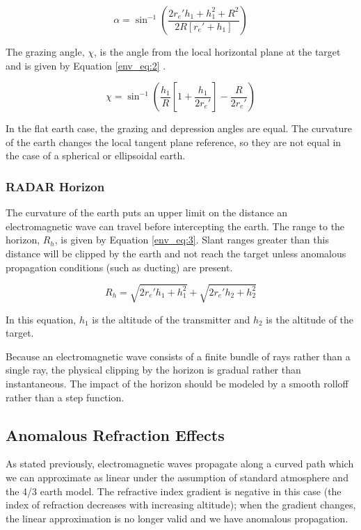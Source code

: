 \begin{equation}
  \label{env_eq:1}
  \alpha = \sin^{-1}\left(\frac{2r_e'h_1 + h_1^2 + R^2}{2R\left[r_e' + h_1 \right]} \right)
  \end{equation}
  \renewcommand{\baselinestretch}{2} \small\normalsize
  
The grazing angle, $\chi$, is the angle from the local horizontal plane at the target and is given by Equation \ref{env_eq:2} \cite{nathanson_radar}.

  \begin{equation}
  \label{env_eq:2}
  \chi = \sin^{-1}\left(\frac{h_1}{R}\left[1 + \frac{h_1}{2r_e'} \right] - \frac{R}{2r_e'} \right)
  \end{equation}
  \renewcommand{\baselinestretch}{2} \small\normalsize
  
In the flat earth case, the grazing and depression angles are equal. The curvature of the earth changes the local tangent plane reference, so they are not equal in the case of a spherical or ellipsoidal earth.
  
\subsubsection{RADAR Horizon}
The curvature of the earth puts an upper limit on the distance an electromagnetic wave can travel before intercepting the earth. The range to the horizon, $R_h$, is given by Equation \ref{env_eq:3}. Slant ranges greater than this distance will be clipped by the earth and not reach the target unless anomalous propagation conditions (such as ducting) are present.

  \begin{equation}
  \label{env_eq:3}
  R_h = \sqrt{2r_e'h_1 + h_1^2} + \sqrt{2r_e'h_2 + h_2^2}
  \end{equation}
  \renewcommand{\baselinestretch}{2} \small\normalsize
  
In this equation, $h_1$ is the altitude of the transmitter and $h_2$ is the altitude of the target.

Because an electromagnetic wave consists of a finite bundle of rays rather than a single ray, the physical clipping by the horizon is gradual rather than instantaneous. The impact of the horizon should be modeled by a smooth rolloff rather than a step function.
  
\subsection{Anomalous Refraction Effects}
As stated previously, electromagnetic waves propagate along a curved path which we can approximate as linear under the assumption of standard atmosphere and the 4/3 earth model. The refractive index gradient is negative in this case (the index of refraction decreases with increasing altitude); when the gradient changes, the linear approximation is no longer valid and we have anomalous propagation. 

